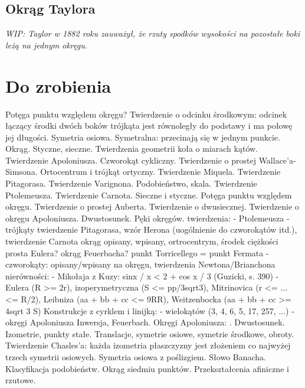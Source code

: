 \subsection{Okrąg Taylora}
{
    \emph{WIP: Taylor w 1882 roku zauważył, że rzuty spodków wysokości na pozostałe boki leżą na jednym okręgu.}
}



\section{Do zrobienia}
Potęga punktu względem okręgu?
Twierdzenie o odcinku środkowym: odcinek łączący środki dwóch boków trójkąta jest równoległy do podstawy i ma połowę jej długości.
Symetria osiowa.
Symetralna: przecinają się w jednym punkcie.
Okrąg.
Styczne, sieczne.
Twierdzenia geometrii koła o miarach kątów.
Twierdzenie Apoloniusza.
Czworokąt cykliczny.
Twierdzenie o prostej Wallace'a-Simsona.
Ortocentrum i trójkąt ortyczny.
Twierdzenie Miquela.
Twierdzenie Pitagorasa.
Twierdzenie Varignona.
Podobieństwo, skala.
Twierdzenie Ptolemeusza.
Twierdzenie Carnota.
Sieczne i styczne.
Potęga punktu względem okręgu.
Twierdzenie o prostej Auberta.
Twierdzenie o dwusiecznej.
Twierdzenie o okręgu Apoloniusza.
Dwustosunek.
Pęki okręgów.
twierdzenia:
- Ptolemeusza
- trójkąty
twierdzenie Pitagorasa, wzór Herona (uogólnienie do czworokątów itd.), twierdzenie Carnota
okrąg opisany, wpisany, ortrocentrym, środek ciężkości
prosta Eulera?
okrąg Feuerbacha?
punkt Torricellego = punkt Fermata
- czworokąty:
opisany/wpisany na okręgu, 
twierdzenia Newtona/Brianchona
nierówności:
- Mikołaja z Kuzy: sinx / x < 2 + cos x / 3 (Guzicki, s. 390)
- Eulera (R >= 2r), izoperymetryczna (S <= pp/3sqrt3), Mitrinovica (r <= ... <= R/2), Leibniza (aa + bb + cc <= 9RR), Weitzenbocka (aa + bb + cc >= 4sqrt 3 S)
Konstrukcje z cyrklem i linijką:
- wielokątów (3, 4, 6, 5, 17, 257, ...)
- okręgi Apoloniusza
Inwersja, Feuerbach.
Okręgi Apoloniusza: \cite[s. 444-461]{guzicki_2021}.
Dwustosunek.
Izometrie, punkty stałe.
Translacje, symetrie osiowe, symetrie środkowe, obroty.
Twierdzenie Chasles'a: każda izometria płaszczyzny jest złożeniem co najwyżej trzech symetrii osiowych.
Symetria osiowa z poślizgiem.
Słowo Banacha.
Klasyfikacja podobieństw.
Okrąg siedmiu punktów. %
Przekształcenia afiniczne i rzutowe.
